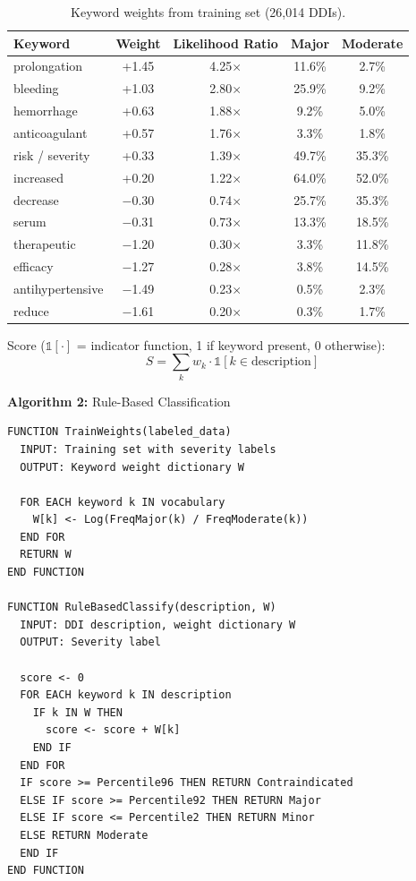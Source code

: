 \documentclass[12pt,a4paper]{article}
\begin{document}
\begin{table}[H]
\centering
\caption{Keyword weights from training set (26,014 DDIs).}
\label{tab:empirical_weights}
\begin{tabular}{@{}lcccc@{}}
\toprule
\textbf{Keyword} & \textbf{Weight} & \textbf{Likelihood Ratio} & \textbf{Major} & \textbf{Moderate} \\
\midrule
prolongation & +1.45 & 4.25$\times$ & 11.6\% & 2.7\% \\
bleeding & +1.03 & 2.80$\times$ & 25.9\% & 9.2\% \\
hemorrhage & +0.63 & 1.88$\times$ & 9.2\% & 5.0\% \\
anticoagulant & +0.57 & 1.76$\times$ & 3.3\% & 1.8\% \\
risk / severity & +0.33 & 1.39$\times$ & 49.7\% & 35.3\% \\
increased & +0.20 & 1.22$\times$ & 64.0\% & 52.0\% \\
\midrule
decrease & $-$0.30 & 0.74$\times$ & 25.7\% & 35.3\% \\
serum & $-$0.31 & 0.73$\times$ & 13.3\% & 18.5\% \\
therapeutic & $-$1.20 & 0.30$\times$ & 3.3\% & 11.8\% \\
efficacy & $-$1.27 & 0.28$\times$ & 3.8\% & 14.5\% \\
antihypertensive & $-$1.49 & 0.23$\times$ & 0.5\% & 2.3\% \\
reduce & $-$1.61 & 0.20$\times$ & 0.3\% & 1.7\% \\
\bottomrule
\end{tabular}
\end{table}

Score ($\mathbb{1}[\cdot]$ = indicator function, 1 if keyword present, 0 otherwise):
\[
S = \sum_{k} w_k \cdot \mathbb{1}[k \in \text{description}]
\]

\medskip
\noindent\textbf{Algorithm 2:} Rule-Based Classification
\begin{verbatim}
FUNCTION TrainWeights(labeled_data)
  INPUT: Training set with severity labels
  OUTPUT: Keyword weight dictionary W
  
  FOR EACH keyword k IN vocabulary
    W[k] <- Log(FreqMajor(k) / FreqModerate(k))
  END FOR
  RETURN W
END FUNCTION

FUNCTION RuleBasedClassify(description, W)
  INPUT: DDI description, weight dictionary W
  OUTPUT: Severity label
  
  score <- 0
  FOR EACH keyword k IN description
    IF k IN W THEN
      score <- score + W[k]
    END IF
  END FOR
  IF score >= Percentile96 THEN RETURN Contraindicated
  ELSE IF score >= Percentile92 THEN RETURN Major
  ELSE IF score <= Percentile2 THEN RETURN Minor
  ELSE RETURN Moderate
  END IF
END FUNCTION
\end{verbatim}
\end{document}
